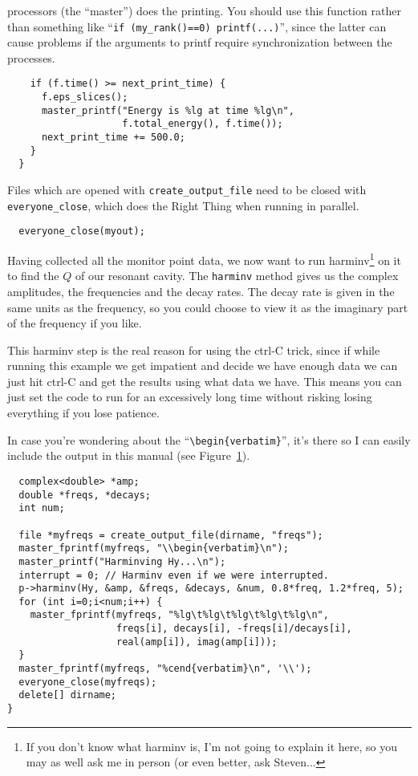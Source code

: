 processors (the ``master'') does the printing.  You should use this
function rather than something like
``\verb!if (my_rank()==0) printf(...)!'', since the latter can cause
problems if the arguments to printf require synchronization between the
processes.
\begin{verbatim}
    if (f.time() >= next_print_time) {
      f.eps_slices();
      master_printf("Energy is %lg at time %lg\n",
                    f.total_energy(), f.time());
      next_print_time += 500.0;
    }
  }
\end{verbatim}
Files which are opened with \verb!create_output_file! need to be closed
with \verb!everyone_close!, which does the Right Thing when running in
parallel.
\begin{verbatim}
  everyone_close(myout);
\end{verbatim}
Having collected all the monitor point data, we now want to run
harminv\footnote{If you don't know what harminv is, I'm not going to
explain it here, so you may as well ask me in person (or even better, ask
Steven...} on it to find the $Q$ of our resonant cavity.  The
\verb!harminv! method gives us the complex amplitudes, the frequencies and
the decay rates.  The decay rate is given in the same units as the
frequency, so you could choose to view it as the imaginary part of the
frequency if you like.

This harminv step is the real reason for using the ctrl-C trick, since if
while running this example we get impatient and decide we have enough data
we can just hit ctrl-C and get the results using what data we have.  This
means you can just set the code to run for an excessively long time without
risking losing everything if you lose patience.
\begin{figure}
\label{complicated_figure}
\begin{center}
\end{center}
\end{figure}

In case you're wondering about the ``\verb!\begin{verbatim}!'', it's there
so I can easily include the output in this manual (see
Figure~\ref{complicated_figure}).
\begin{verbatim}
  complex<double> *amp;
  double *freqs, *decays;
  int num;
  
  file *myfreqs = create_output_file(dirname, "freqs");
  master_fprintf(myfreqs, "\\begin{verbatim}\n");
  master_printf("Harminving Hy...\n");
  interrupt = 0; // Harminv even if we were interrupted.
  p->harminv(Hy, &amp, &freqs, &decays, &num, 0.8*freq, 1.2*freq, 5);
  for (int i=0;i<num;i++) {
    master_fprintf(myfreqs, "%lg\t%lg\t%lg\t%lg\t%lg\n",
                   freqs[i], decays[i], -freqs[i]/decays[i],
                   real(amp[i]), imag(amp[i]));
  }
  master_fprintf(myfreqs, "%cend{verbatim}\n", '\\');
  everyone_close(myfreqs);
  delete[] dirname;
}
\end{verbatim}
